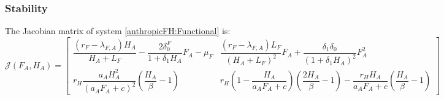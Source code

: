 \documentclass{article}
\newcommand{\lfa}{\lambda_{F, A}}
\newcommand{\df}{\delta_0^F}
\begin{document}
\subsubsection{Stability}
The Jacobian matrix of system \eqref{anthropicFH:Functional} is:
\begin{equation}
\mathcal{J}(F_A,H_A) =  \begin{bmatrix}
\dfrac{(r_F - \lfa) H_A}{H_A+L_F}- \dfrac{2\df}{1 + \delta_1 H_A}F_A - \mu_F & \dfrac{(r_F - \lfa)L_F}{(H_A+L_F)^2}F_A + \dfrac{\delta_1 \delta_0}{(1+\delta_1 H_A)^2} F_A^2 \\
r_H \dfrac{a_AH_A^2}{(a_AF_A+c)^2} (\dfrac{H_A}{\beta}-1) & r_H(1-\dfrac{H_A}{a_AF_A+c})(\dfrac{2H_A}{\beta}-1) - \dfrac{r_H H_A}{a_AF_A+c}(\dfrac{H_A}{\beta}-1)
\end{bmatrix}
\end{equation}
\end{document}
